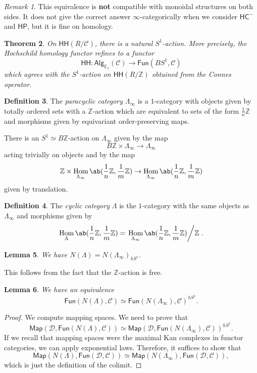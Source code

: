 \documentclass[10pt, oneside]{memoir}
\newtheorem{thm}{Theorem}[subsection]
\newtheorem{lem}[thm]{Lemma}
\theoremstyle{definition}
\newtheorem{defn}[thm]{Definition}
\theoremstyle{remark}
\newtheorem{rmk}[thm]{Remark}
\theoremstyle{plain}
\theoremstyle{definition}
\theoremstyle{remark}
\newcommand{\Z}{\mathbb{Z}}
\newcommand{\E}{\mathbb{E}}
\newcommand{\mc}[1]{\mathcal{#1}}
\newcommand{\ms}[1]{\mathsf{#1}}
\newcommand{\1}{\mathbf{1}}
\newcommand{\2}{\mathbf{2}}
\newcommand{\3}{\mathbf{3}}
\newcommand{\HC}{\ms{HC}}
\newcommand{\HH}{\ms{HH}}
\newcommand{\HP}{\ms{HP}}
\DeclareMathOperator{\Hom}{Hom}
\begin{document}
\begin{rmk}
    This equivalence is \textbf{not} compatible with monoidal structures on both sides. It does not give the correct answer $\infty$-categorically when we consider $\HC^-$ and $\HP$, but it is fine on homology.
\end{rmk}

\begin{thm}\label{thm:s1action}
    On $\HH(R/\mc{C})$, there is a natural $S^1$-action. More precisely, the Hochschild homology functor refines to a functor
    \[ \HH \colon \ms{Alg}_{\E_1}(\mc{C}) \to \ms{Fun}(BS^1, \mc{C}) \]
    which agrees with the $S^1$-action on $\HH(R/\Z)$ obtained from the Connes operator.
\end{thm}

\begin{defn}
    The \textit{paracyclic category} $\Lambda_{\infty}$ is a $1$-category with objects given by totally ordered sets with a $\Z$-action which are equivalent to sets of the form $\frac{1}{n} \Z$ and morphisms given by equivariant order-preserving maps.
\end{defn}

There is an $S^1 \simeq B\Z$-action on $\Lambda_{\infty}$ given by the map
\[ B\Z \times \Lambda_{\infty} \to \Lambda_{\infty} \]
acting trivially on objects and by the map
\[ \Z \times \Hom_{\Lambda_{\infty}} \ab(\frac{1}{n}\Z, \frac{1}{m}\Z) \to \Hom_{\Lambda_{\infty}} \ab(\frac{1}{n}\Z, \frac{1}{m}\Z) \]
given by translation.

\begin{defn}
    The \textit{cyclic category} $\Lambda$ is the $1$-category with the same objects as $\Lambda_{\infty}$ and morphisms given by
    \[ \Hom_{\Lambda} \ab(\frac{1}{n} \Z, \frac{1}{m}\Z) = \left. \Hom_{\Lambda_{\infty}} \ab(\frac{1}{n}\Z, \frac{1}{m}\Z) \middle/ \Z \right. . \]
\end{defn}

\begin{lem}
    We have $N(\Lambda) = N(\Lambda_{\infty})_{hS^1}$.
\end{lem}

This follows from the fact that the $\Z$-action is free.

\begin{lem}
    We have an equivalence
    \[ \ms{Fun}(N(\Lambda), \mc{C}) \simeq \ms{Fun}(N(\Lambda_{\infty}), \mc{C})^{hS^1}. \]
\end{lem}

\begin{proof}
    We compute mapping spaces. We need to prove that
    \[ \ms{Map}(\mc{D}, \ms{Fun}(N(\Lambda), \mc{C})) \simeq \ms{Map}(\mc{D}, \ms{Fun}(N(\Lambda_{\infty}), \mc{C}))^{hS^1}. \]
    If we recall that mapping spaces were the maximal Kan complexes in functor categories, we can apply exponential laws. Therefore, it suffices to show that
    \[ \ms{Map}(N(\Lambda), \ms{Fun}(\mc{D}, \mc{C})) \simeq \ms{Map}(N(\Lambda_{\infty}), \ms{Fun}(\mc{D}, \mc{C})), \]
    which is just the definition of the colimit.
\end{proof}
\end{document}
